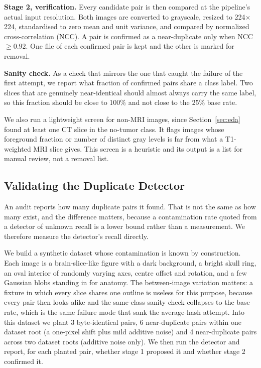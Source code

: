 \documentclass[11pt]{article}
\begin{document}
\textbf{Stage 2, verification.} Every candidate pair is then compared at the pipeline's actual input resolution. Both images are converted to grayscale, resized to 224$\times$224, standardised to zero mean and unit variance, and compared by normalized cross-correlation (NCC). A pair is confirmed as a near-duplicate only when NCC $\geq 0.92$. One file of each confirmed pair is kept and the other is marked for removal.

\textbf{Sanity check.} As a check that mirrors the one that caught the failure of the first attempt, we report what fraction of confirmed pairs share a class label. Two slices that are genuinely near-identical should almost always carry the same label, so this fraction should be close to 100\% and not close to the 25\% base rate.

We also run a lightweight screen for non-MRI images, since Section~\ref{sec:eda} found at least one CT slice in the no-tumor class. It flags images whose foreground fraction or number of distinct gray levels is far from what a T1-weighted MRI slice gives. This screen is a heuristic and its output is a list for manual review, not a removal list.

\subsection{Validating the Duplicate Detector}
\label{sec:audit_validation_method}
An audit reports how many duplicate pairs it found. That is not the same as how many exist, and the difference matters, because a contamination rate quoted from a detector of unknown recall is a lower bound rather than a measurement. We therefore measure the detector's recall directly.

We build a synthetic dataset whose contamination is known by construction. Each image is a brain-slice-like figure with a dark background, a bright skull ring, an oval interior of randomly varying axes, centre offset and rotation, and a few Gaussian blobs standing in for anatomy. The between-image variation matters: a fixture in which every slice shares one outline is useless for this purpose, because every pair then looks alike and the same-class sanity check collapses to the base rate, which is the same failure mode that sank the average-hash attempt. Into this dataset we plant 3 byte-identical pairs, 6 near-duplicate pairs within one dataset root (a one-pixel shift plus mild additive noise) and 4 near-duplicate pairs across two dataset roots (additive noise only). We then run the detector and report, for each planted pair, whether stage 1 proposed it and whether stage 2 confirmed it.
\end{document}
